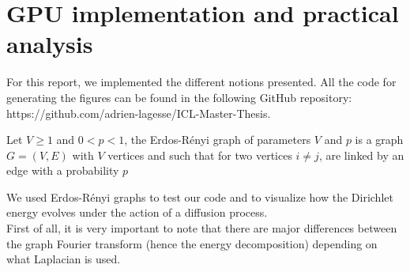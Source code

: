 \documentclass[12pt]{article}
\begin{document}
\newpage
\section{GPU implementation and practical analysis}

For this report, we implemented the different notions presented. All the code for generating the figures can be found in the following GitHub repository: https://github.com/adrien-lagesse/ICL-Master-Thesis. 

\begin{definition}
    Let $V \geq 1$ and $0 < p <1$, the Erdos-Rényi graph of parameters $V$ and $p$ is a graph $G=(V,E)$ with $V$ vertices and such that for two vertices $i \neq j $, are linked by an edge with a probability $p$
\end{definition}

We used Erdos-Rényi graphs to test our code and to visualize how the Dirichlet energy evolves under the action of a diffusion process.\\

First of all, it is very important to note that there are major differences between the graph Fourier transform (hence the energy decomposition) depending on what Laplacian is used.\\
\end{document}
